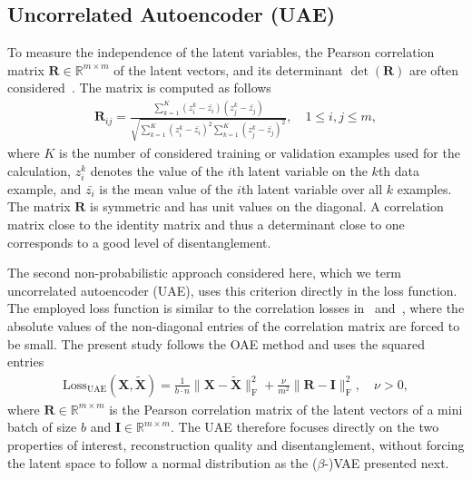 \subsection{Uncorrelated Autoencoder (UAE)}
To measure the independence of the latent variables, the Pearson correlation matrix $\mathbf{R} \in \mathbb{R}^{m\times m}$ of the latent vectors, and its determinant $\det(\mathbf{R})$ are often considered~\cite{eivazi:2022, kang:2022, CACCIARELLI2022107853, solera-rico:2024}. The matrix is computed as follows
\begin{align*}
    \mathbf{R}_{ij} = \frac{\sum^K_{k=1}(z_i^k-\bar{z_{i}})(z_j^k-\bar{z_j})}{\sqrt{\sum^K_{k=1}(z_i^k-\bar{z_{i}})^2\sum^K_{k=1}(z_j^k-\bar{z_{j}})^2}}, \quad 1\le i,j \le m,
\end{align*}
where $K$ is the number of considered training or validation examples used for the calculation, $z_i^k$ denotes the value of the $i$th latent variable on the $k$th data example, and $\bar{z_{i}}$ is the mean value of the $i$th latent variable over all $k$ examples.
The matrix $\mathbf{R}$ is symmetric and has unit values on the diagonal. 
A correlation matrix close to the identity matrix and thus a determinant close to one corresponds to a good level of disentanglement. 

The second non-probabilistic approach considered here, which we term uncorrelated autoencoder (UAE), uses this criterion directly in the loss function. The employed loss function is similar to the correlation losses in~\cite{KIM2021148} and~\cite{Savargaonkar:2024}, where the absolute values of the non-diagonal entries of the correlation matrix are forced to be small. The present study follows the OAE method and uses the squared entries
\begin{align}
    \mathrm{Loss_{UAE}}(\mathbf{X},\tilde{\mathbf{X}}) =  \frac{1}{b\cdot n}\lVert \mathbf{X} - \tilde{\mathbf{X}} \rVert^2_\mathrm{F} + 
    \frac{\nu}{m^2}\lVert \mathbf{R} - \mathbf{I} \rVert^2_\mathrm{F}, \quad \nu>0,
    \label{eq:our_loss}
\end{align}
where $\mathbf{R} \in \mathbb{R}^{m\times m}$ is the Pearson correlation matrix of the latent vectors of a mini batch of size $b$ and $\mathbf{I} \in \mathbb{R}^{m\times m}$.
%
The UAE therefore focuses directly on the two properties of interest, reconstruction quality and disentanglement, without forcing the latent space to follow a normal distribution as the ($\beta$-)VAE presented next.  

